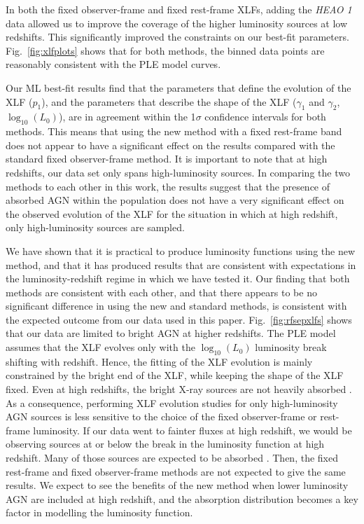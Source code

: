 \documentclass[fleqn,usenatbib]{mnras}
\begin{document}
    In both the fixed observer-frame and fixed rest-frame XLFs, adding the \textit{HEAO 1} data allowed us to improve the coverage of the higher luminosity sources at low redshifts. 
    This significantly improved the constraints on our best-fit parameters.
    Fig.~\ref{fig:xlfplots} shows that for both methods, the binned data points are reasonably consistent with the PLE model curves.
    
    Our ML best-fit results find that the parameters that define the evolution of the XLF ($p_1$), and the parameters that describe the shape of the XLF ($\gamma_1$ and $\gamma_2$, $\log_{10}(L_{0})$), are in agreement within the 1$\sigma$ confidence intervals for both methods.
    This means that using the new method with a fixed rest-frame band does not appear to have a significant effect on the results compared with the standard fixed observer-frame method.
    It is important to note that at high redshifts, our data set only spans high-luminosity sources.
    In comparing the two methods to each other in this work, the results suggest that the presence of absorbed AGN within the population does not have a very significant effect on the observed evolution of the XLF for the situation in which at high redshift, only high-luminosity sources are sampled.

    We have shown that it is practical to produce luminosity functions using the new method, and that it has produced results that are consistent with expectations in the luminosity-redshift regime in which we have tested it. 
    Our finding that both methods are consistent with each other, and that there appears to be no significant difference in using the new and standard methods, is consistent with the expected outcome from our data used in this paper. 
    Fig.~\ref{fig:rfsepxlfs} shows that our data are limited to bright AGN at higher redshifts. 
    The PLE model assumes that the XLF evolves only with the $\log_{10}(L_{0})$ luminosity break shifting with redshift. 
    Hence, the fitting of the XLF evolution is mainly constrained by the bright end of the XLF, while keeping the shape of the XLF fixed. 
    Even at high redshifts, the bright X-ray sources are not heavily absorbed \citep[e.g.][]{ebrero2009xmm}.
    As a consequence, performing XLF evolution studies for only high-luminosity AGN sources is less sensitive to the choice of the fixed observer-frame or rest-frame luminosity.
    If our data went to fainter fluxes at high redshift, we would be observing sources at or below the break in the luminosity function at high redshift.
    Many of those sources are expected to be absorbed \citep[e.g. see Figure 5 in][]{ebrero2009xmm}. 
    Then, the fixed rest-frame and fixed observer-frame methods are not expected to give the same results.
    We expect to see the benefits of the new method when lower luminosity AGN are included at high redshift, and the absorption distribution becomes a key factor in modelling the luminosity function.
    
\end{document}
